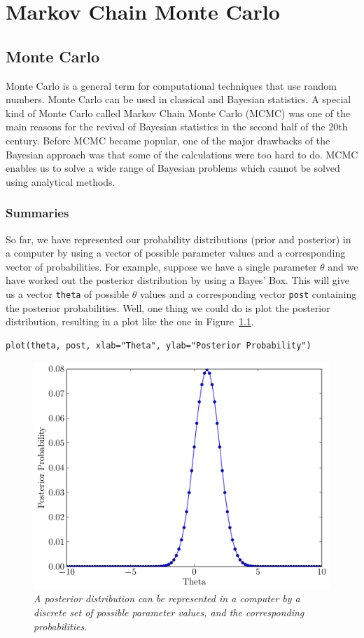 \chapter{Markov Chain Monte Carlo}
\section{Monte Carlo}
Monte Carlo is a general term for computational techniques that use random
numbers.
Monte Carlo can be used in classical and Bayesian statistics. A special kind
of Monte Carlo
called Markov Chain Monte Carlo (MCMC) was one of the main reasons
for the revival of Bayesian statistics in the second half of the 20th century.
Before MCMC became popular, one of the major drawbacks of the Bayesian approach
was that some of the calculations were too hard to do. MCMC enables us to solve
a wide range of Bayesian problems which cannot be solved using analytical
methods.

\subsection{Summaries}
So far, we have represented our probability distributions (prior and posterior)
in a computer by using a vector of possible parameter values and a corresponding
vector of probabilities. For example, suppose we have a single parameter $\theta$
and we have worked out the posterior distribution by using a Bayes' Box. This
will give us a vector {\tt theta} of possible $\theta$ values and a corresponding
vector {\tt post} containing the posterior probabilities. Well, one thing we could
do is plot the posterior distribution, resulting in a plot like the one in
Figure~\ref{fig:normal}.
\begin{verbatim}
plot(theta, post, xlab="Theta", ylab="Posterior Probability")
\end{verbatim}

\begin{figure}[ht!]
\begin{center}
\includegraphics[scale=0.5]{Figures/normal.pdf}
\caption{\it A posterior distribution can be represented in a computer by a discrete
set of possible parameter values, and the corresponding probabilities.\label{fig:normal}}
\end{center}
\end{figure}

